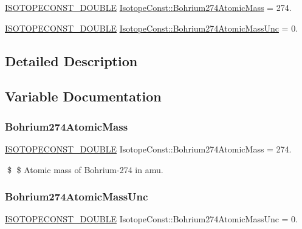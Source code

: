 \begin{DoxyCompactItemize}
\item 
\mbox{\hyperlink{group___isotope_const-_macros_ga8f45a7272ce02c0b4c65c44636ed719a}{I\+S\+O\+T\+O\+P\+E\+C\+O\+N\+S\+T\+\_\+\+D\+O\+U\+B\+LE}} \mbox{\hyperlink{group___isotope_const-_bohrium-_bh274_ga8674abd9c95415093264f1233e838547}{Isotope\+Const\+::\+Bohrium274\+Atomic\+Mass}} = 274.
\item 
\mbox{\hyperlink{group___isotope_const-_macros_ga8f45a7272ce02c0b4c65c44636ed719a}{I\+S\+O\+T\+O\+P\+E\+C\+O\+N\+S\+T\+\_\+\+D\+O\+U\+B\+LE}} \mbox{\hyperlink{group___isotope_const-_bohrium-_bh274_ga23aeee5aca5f010e8fb14fe1343603cb}{Isotope\+Const\+::\+Bohrium274\+Atomic\+Mass\+Unc}} = 0.
\end{DoxyCompactItemize}


\subsection{Detailed Description}


\subsection{Variable Documentation}
\mbox{\label{group___isotope_const-_bohrium-_bh274_ga8674abd9c95415093264f1233e838547}} 
\subsubsection{\texorpdfstring{Bohrium274\+Atomic\+Mass}{Bohrium274AtomicMass}}
{\footnotesize\ttfamily \mbox{\hyperlink{group___isotope_const-_macros_ga8f45a7272ce02c0b4c65c44636ed719a}{I\+S\+O\+T\+O\+P\+E\+C\+O\+N\+S\+T\+\_\+\+D\+O\+U\+B\+LE}} Isotope\+Const\+::\+Bohrium274\+Atomic\+Mass = 274.}

\$ \$ Atomic mass of Bohrium-\/274 in amu. \mbox{\label{group___isotope_const-_bohrium-_bh274_ga23aeee5aca5f010e8fb14fe1343603cb}} 
\subsubsection{\texorpdfstring{Bohrium274\+Atomic\+Mass\+Unc}{Bohrium274AtomicMassUnc}}
{\footnotesize\ttfamily \mbox{\hyperlink{group___isotope_const-_macros_ga8f45a7272ce02c0b4c65c44636ed719a}{I\+S\+O\+T\+O\+P\+E\+C\+O\+N\+S\+T\+\_\+\+D\+O\+U\+B\+LE}} Isotope\+Const\+::\+Bohrium274\+Atomic\+Mass\+Unc = 0.}

